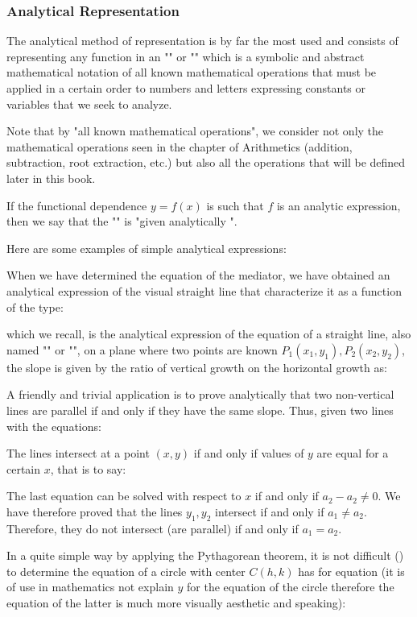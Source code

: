 	\subsubsection{Analytical Representation}
	The analytical method of representation is by far the most used and consists of representing any function in an "" or "" which is a symbolic and abstract mathematical notation of all known mathematical operations that must be applied in a certain order to numbers and letters expressing constants or variables that we seek to analyze.
	
	Note that by "all known mathematical operations", we consider not only the mathematical operations seen in the chapter of Arithmetics (addition, subtraction, root extraction, etc.) but also all the operations that will be defined later in this book.
	
	If the functional dependence $y=f(x)$ is such that $f$ is an analytic expression, then we say that the "" is "given analytically ". 

	Here are some examples of simple analytical expressions:
	
	When we have determined the equation of the mediator, we have obtained an analytical expression of the visual straight line that characterize it as a function of the type:
	
	which we recall, is the analytical expression of the equation of a straight line, also named "" or "", on a plane where two points are known $P_1(x_1,y_1),P_2(x_2,y_2)$, the slope is given by the ratio of vertical growth on the horizontal growth as:
	
	A friendly and trivial application is to prove analytically that two non-vertical lines are parallel if and only if they have the same slope. Thus, given two lines with the equations:
	
	The lines intersect at a point $(x, y)$ if and only if values of $y$ are equal for a certain $x$, that is to say:
	
	The last equation can be solved with respect to $x$ if and only if $a_2-a_2\neq 0$. We have therefore proved that the lines $y_1,y_2$ intersect if and only if $a_1\neq a_2$. Therefore, they do not intersect (are parallel) if and only if $a_1=a_2$.
	
	In a quite simple way by applying the Pythagorean theorem, it is not difficult () to determine the equation of a circle with center $C (h, k)$ has for equation (it is of use in mathematics not explain $y$ for the equation of the circle therefore the equation of the latter is much more visually aesthetic and speaking):
	
